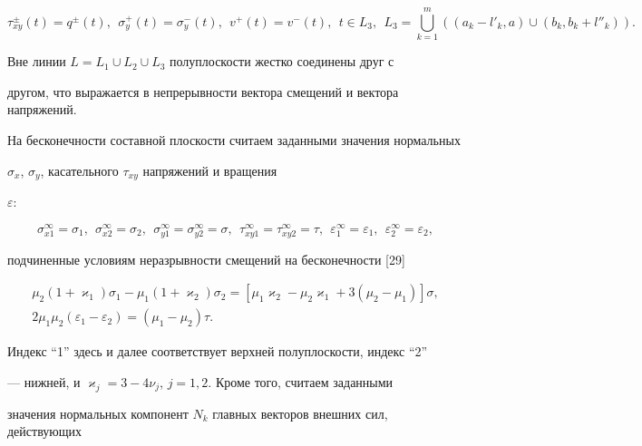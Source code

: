 \begin{equation} 


\tau^\pm_{xy}(t)=q^\pm(t),\ \ \sigma^+_y(t)=\sigma^-_y(t),\ \ 


v^+(t)=v^-(t),\ \ t\in L_3,\ \ L_3=\bigcup^m_{k=1} 


((a_k-l'_k,a)\cup(b_k,b_k+l''_k)). 


\end{equation} 


Вне линии $L=L_1\cup L_2\cup L_3$ полуплоскости жестко соединены друг с 


другом, что выражается в непрерывности вектора смещений и вектора напряжений. 


На бесконечности составной плоскости считаем заданными значения нормальных 


$\sigma_x$, $\sigma_y$, касательного $\tau_{xy}$ напряжений и вращения 


$\varepsilon$: 


$$ 


\sigma^\infty_{x1}=\sigma_1,\ \ \sigma^\infty_{x2}=\sigma_2,\ \ 


\sigma^\infty_{y1}=\sigma^\infty_{y2}=\sigma,\ \ 


\tau^\infty_{xy1}=\tau^\infty_{xy2}=\tau,\ \ 


\varepsilon^\infty_1=\varepsilon_1,\ \ \varepsilon^\infty_2= 


\varepsilon_2, 


$$ 


подчиненные условиям неразрывности смещений на бесконечности [29] 


\begin{gather*} 


\mu_2(1+\varkappa_1)\sigma_1-\mu_1(1+\varkappa_2)\sigma_2= 


[\mu_1\varkappa_2-\mu_2\varkappa_1+3(\mu_2-\mu_1)]\sigma,\\ 


% 


2\mu_1\mu_2(\varepsilon_1-\varepsilon_2)=(\mu_1-\mu_2)\tau. 


\end{gather*} 


Индекс ``1'' здесь и далее соответствует верхней полуплоскости, индекс ``2'' 


--- нижней, и $\varkappa_j=3-4\nu_j$, $j=1,2$. Кроме того, считаем заданными 


значения нормальных компонент $N_k$ главных векторов внешних сил, действующих 


